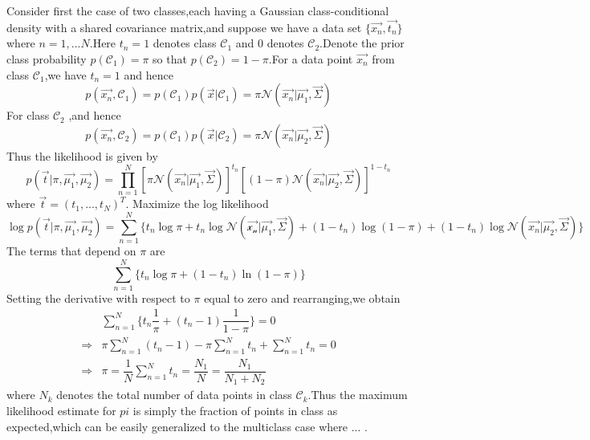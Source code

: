 Consider first the case of two classes,each having a Gaussian class-conditional density with a shared covariance matrix,and suppose we have a data set $\{\vec{x_n},\vec{t_n}\}$ where $n=1,...N$.Here $t_n=1$ denotes class $\mathcal{C}_1$ and $0$ denotes $\mathcal{C}_2$.Denote the prior class probability $p(\mathcal{C}_1) = \pi$ so that $p(\mathcal{C}_2) =  1- \pi$.For a data point $\vec{x_n}$ from class $\mathcal{C}_1$,we have $t_n=1$ and hence
\begin{equation}
p(\vec{x_n},\mathcal{C}_1) = p(\mathcal{C}_1)p(\vec{x}|\mathcal{C}_1) = 
\pi \mathcal{N}(\vec{x_n}|\vec{\mu_1},\vec{\Sigma})
\end{equation}
For class $\mathcal{C}_2$ ,and hence
\begin{equation}
p(\vec{x_n},\mathcal{C}_2) = p(\mathcal{C}_1)p(\vec{x}|\mathcal{C}_2) = 
\pi \mathcal{N}(\vec{x_n}|\vec{\mu_2},\vec{\Sigma})
\end{equation}
Thus the likelihood is given by
\begin{equation}
p(\vec{t}|\pi,\vec{\mu_1},\vec{\mu_2}) = \prod_{n=1}^{N}
[\pi \mathcal{N}(\vec{x_n}|\vec{\mu_1},\vec{\Sigma})]^{t_n}
[(1-\pi)\mathcal{N}(\vec{x_n}|\vec{\mu_2},\vec{\Sigma})]^{1-t_n}
\end{equation}
where $\vec{t} = (t_1,...,t_N)^T$.
Maximize the log likelihood
\begin{equation}
\log p(\vec{t}|\pi,\vec{\mu_1},\vec{\mu_2}) = 
\sum_{n=1}^{N}\{t_n\log \pi + t_n\log \mathcal{N(\vec{x_n}|\vec{\mu_1},\vec{\Sigma})}+
(1-t_n)\log(1-\pi) + (1-t_n)\log \mathcal{N}(\vec{x_n}|\vec{\mu_2},\vec{\Sigma})  \}
\end{equation}
The terms that depend on $\pi$ are
\begin{equation}
\sum_{n=1}^{N}\{t_n\log\pi + (1-t_n)\ln(1-\pi)  \}
\end{equation}
Setting the derivative with respect to $\pi$ equal to zero and rearranging,we obtain
\begin{align}
&\sum_{n=1}^{N}\{t_n\dfrac{1}{\pi} +(t_n-1)\dfrac{1}{1-\pi}  \} = 0 \\
\Rightarrow & \pi\sum_{n=1}^{N}(t_n-1) -\pi\sum_{n=1}^{N}t_n + \sum_{n=1}^{N}t_n = 0 \\
\Rightarrow & \pi = \dfrac{1}{N}\sum_{n=1}^{N}t_n = \dfrac{N_1}{N}=\dfrac{N_1}{N_1+N_2}
\end{align}
where $N_k$ denotes the total number of data points in class $\mathcal{C}_k$.Thus the maximum likelihood estimate for $pi$ is simply the fraction of points in class as expected,which can be easily generalized to the multiclass case where ... .

